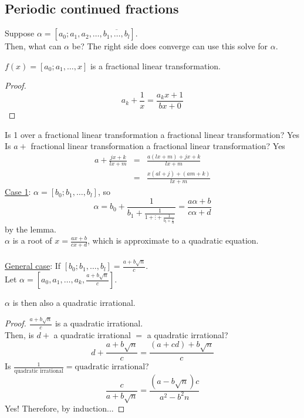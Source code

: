   \subsection*{Periodic continued fractions}
    Suppose $\alpha = [a_0; a_1, a_2, \ldots, \overline{b_1, \ldots, b_l}]$.\\
    Then, what can $\alpha$ be? The right side does converge can use this solve
    for $\alpha$.\\
    \begin{lemma}
      $f(x) = [a_0; a_1, \ldots, x]$ is a fractional linear transformation.
    \end{lemma}
    \begin{proof}
      $$
        a_k + \frac{1}{x} = \frac{a_kx + 1}{bx + 0}
      $$
    \end{proof}
    Is 1 over a fractional linear transformation a fractional linear 
    transformation? Yes\\
    Is $a + $ fractional linear transformation a fractional linear 
    transformation? Yes\\
    \begin{eqnarray*}
      a + \frac{jx + k}{lx + m} & = & \frac{a(lx + m) + jx + k}{lx + m}\\
        & = & \frac{x (al + j) + (am + k)}{ lx + m}
    \end{eqnarray*}
    \underline{Case 1}: $\alpha = [b_0; b_1, \ldots, b_l]$, so
    $$
      \alpha = b_0 + \frac{1}{b_1 + \frac{1}{1 + \vdots + \frac{1}{b_l + 
      \frac{1}{\alpha}}}} = \frac{a \alpha + b}{c \alpha + d}
    $$
    by the lemma.\\
    $\alpha$ is a root of $x = \frac{ax + b}{cx+d}$, which is approximate to
    a quadratic equation.\\\\
    \underline{General case}:
    If $[b_0; b_1, \ldots, b_l] = \frac{a + b\sqrt{n}}{c}$.\\
    Let $\alpha = [a_0, a_1, \ldots, a_k, \frac{a + b \sqrt{n}}{c}]$.\\
    \begin{lemma}
      $\alpha$ is then also a quadratic irrational.
    \end{lemma}
    \begin{proof}
      $\frac{a + b\sqrt{n}}{c}$ is a quadratic irrational.\\
      Then, is $d + $ a quadratic irrational $ = $ a quadratic irrational?\\
      $$
        d + \frac{a + b\sqrt{n}}{c} = \frac{(a+cd) + b\sqrt{n}}{c}
      $$
      Is $\frac{1}{\text{quadratic irrational}} = 
        \text{quadratic irrational}$?\\
      $$
        \frac{c}{a + b\sqrt{n}} = \frac{(a - b\sqrt{n})c}{a^2 - b^2n}
      $$
      Yes!
      Therefore, by induction...
    \end{proof}
